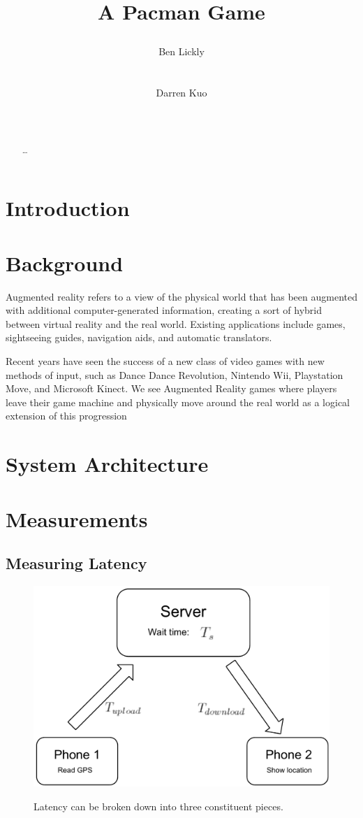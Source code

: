 \documentclass{acm_proc_article-sp}
\title{A Pacman Game
\numberofauthors{2}
\author{
\alignauthor Ben Lickly \\
       \affaddr{University of California, Berkeley}\\
       \affaddr{Berkeley, CA, USA} \\
       \email{blickly@eecs.berkeley.edu}
\alignauthor Darren Kuo \\
       \affaddr{University of California, Berkeley}\\
       \affaddr{Berkeley, CA, USA} \\
       \email{darrenkuo@eecs.berkeley.edu}
}
}
\begin{document}
\maketitle

\begin{abstract}
\ldots
\cite{ZombieRun}
\end{abstract}

\section{Introduction}
\section{Background}
Augmented reality refers to a view of the physical world that has been
augmented with additional computer-generated information, creating a sort of
hybrid between virtual reality and the real world. Existing applications
include games, sightseeing guides, navigation aids, and automatic translators.

Recent years have seen the success of a new class of video games with new
methods of input, such as Dance Dance Revolution, Nintendo Wii, Playstation
Move, and Microsoft Kinect. We see Augmented Reality games where players leave
their game machine and physically move around the real world as a logical
extension of this progression

\section{System Architecture}
\section{Measurements}
\subsection{Measuring Latency}

\begin{figure}
\centering
\includegraphics[scale=0.4]{figs/LatencyExplanation}
\label{fig:LatencyExplanation}
\caption{Latency can be broken down into three constituent pieces.}
\end{figure}
\end{document}
